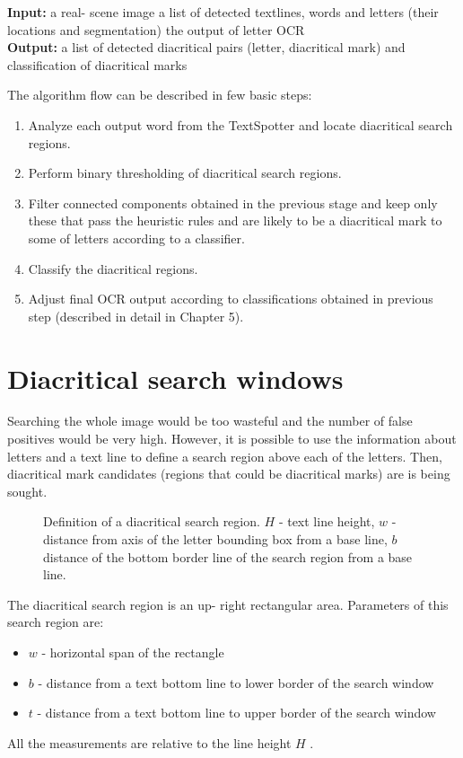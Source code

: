\documentclass[12pt,a4paper]{report}
\begin{document}
\textbf{Input:} a real- scene image a list of detected textlines, words and letters (their locations and segmentation) the output of letter OCR \\
\textbf{Output:} a list of detected diacritical pairs (letter, diacritical mark) and classification of diacritical marks

The algorithm flow can be described in few basic steps:
\begin{enumerate}
    \item Analyze each output word from the TextSpotter and locate diacritical search regions.
    \item Perform binary thresholding of diacritical search regions.
    \item Filter connected components obtained in the previous stage and keep only these that pass the heuristic rules and are likely to be a diacritical mark to some of letters according to a classifier.
    \item Classify the diacritical regions.
    \item Adjust final OCR output according to classifications obtained in previous step (described in detail in Chapter 5).
\end{enumerate}

\section{Diacritical search windows}
Searching the whole image would be too wasteful and the number of false positives would be very high. However, it is possible to use the information about letters and a text line to define a search region above each of the letters. Then, diacritical mark candidates (regions that could be diacritical marks) are is being sought.

\begin{figure}[htbp]
    \centering
    \caption{Definition of a diacritical search region. $H$ - text line height, $w$ - distance from axis of the letter bounding box from a base line, $b$ distance of the bottom border line of the search region from a base line.}
    \label{fig:diacritic-search}
\end{figure}

The diacritical search region is an up- right rectangular area. Parameters of this search region are:
\begin{itemize}
    \item $w$ - horizontal span of the rectangle
    \item $b$ - distance from a text bottom line to lower border of the search window
    \item $t$ - distance from a text bottom line to upper border of the search window
\end{itemize}
All the measurements are relative to the line height $H$ .
\end{document}
